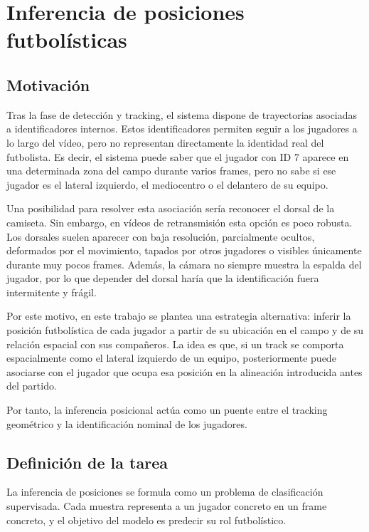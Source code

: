 \section{Inferencia de posiciones futbolísticas}
\label{sec:clasificacion-posicional}

\subsection{Motivación}

Tras la fase de detección y tracking, el sistema dispone de trayectorias asociadas a identificadores internos. Estos identificadores permiten seguir a los jugadores a lo largo del vídeo, pero no representan directamente la identidad real del futbolista. Es decir, el sistema puede saber que el jugador con ID 7 aparece en una determinada zona del campo durante varios frames, pero no sabe si ese jugador es el lateral izquierdo, el mediocentro o el delantero de su equipo.

Una posibilidad para resolver esta asociación sería reconocer el dorsal de la camiseta. Sin embargo, en vídeos de retransmisión esta opción es poco robusta. Los dorsales suelen aparecer con baja resolución, parcialmente ocultos, deformados por el movimiento, tapados por otros jugadores o visibles únicamente durante muy pocos frames. Además, la cámara no siempre muestra la espalda del jugador, por lo que depender del dorsal haría que la identificación fuera intermitente y frágil.

Por este motivo, en este trabajo se plantea una estrategia alternativa: inferir la posición futbolística de cada jugador a partir de su ubicación en el campo y de su relación espacial con sus compañeros. La idea es que, si un track se comporta espacialmente como el lateral izquierdo de un equipo, posteriormente puede asociarse con el jugador que ocupa esa posición en la alineación introducida antes del partido.

Por tanto, la inferencia posicional actúa como un puente entre el tracking geométrico y la identificación nominal de los jugadores.

\subsection{Definición de la tarea}

La inferencia de posiciones se formula como un problema de clasificación supervisada. Cada muestra representa a un jugador concreto en un frame concreto, y el objetivo del modelo es predecir su rol futbolístico.

